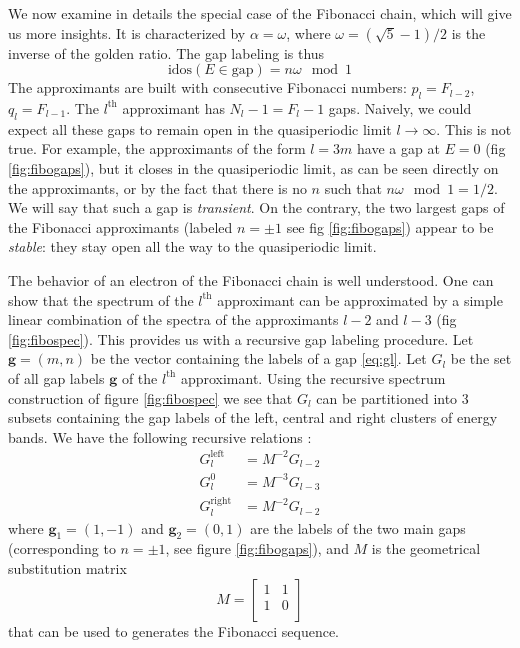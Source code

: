 \documentclass[a4paper]{jpconf}
\newcommand{\gv}{\ensuremath{\mathbf{g}}}
\newcommand{\sub}{\ensuremath{M}}
\newcommand{\id}{\ensuremath{\text{idos}}}
\begin{document}
We now examine in details the special case of the Fibonacci chain, which will give us more insights.
It is characterized by $\alpha = \omega$, where $\omega = (\sqrt{5}-1)/2$ is the inverse of the golden ratio.
The gap labeling is thus
\begin{equation}
	\label{eq:fibogaps}
	\id(E \in \text{gap}) = n \omega \mod 1
\end{equation}
The approximants are built with consecutive Fibonacci numbers: $p_l = F_{l-2}$, $q_l = F_{l-1}$.
The $l^\text{th}$ approximant has $N_l-1 = F_l -1$ gaps.
Naively, we could expect all these gaps to remain open in the quasiperiodic limit $l \to \infty$.
This is not true. 
For example, the approximants of the form $l = 3m$ have a gap at $E=0$ (fig \eqref{fig:fibogaps}), but it closes in the quasiperiodic limit, as can be seen directly on the approximants, or by the fact that there is no $n$ such that $n \omega \mod 1 = 1/2$.
We will say that such a gap is \emph{transient}.
On the contrary, the two largest gaps of the Fibonacci approximants (labeled $n = \pm 1$ see fig \eqref{fig:fibogaps}) appear to be \emph{stable}: they stay open all the way to the quasiperiodic limit.

The behavior of an electron of the Fibonacci chain is well understood. 
One can show \cite{Niu90, Piechon95} that the spectrum of the $l^\text{th}$ approximant can be approximated by a simple linear combination of the spectra of the approximants $l-2$ and $l-3$ (fig \eqref{fig:fibospec}).
This provides us with a recursive gap labeling procedure. 
Let $\gv = (m, n)$ be the vector containing the labels of a gap \eqref{eq:gl}.
Let $G_l$ be the set of all gap labels $\gv$ of the $l^\text{th}$ approximant.
Using the recursive spectrum construction of figure \eqref{fig:fibospec} we see that $G_l$ can be partitioned into 3 subsets containing the gap labels of the left, central and right clusters of energy bands.
We have the following recursive relations \cite{fiboperturbMace}:
\begin{align}
	G_{l}^{\text{left}} &= \sub^{-2} G_{l-2} \\
	G_{l}^0 &= \sub^{-3} G_{l-3} \\
	G_{l}^\text{right} &= \sub^{-2} G_{l-2}
\end{align}
where $\gv_1 = (1, -1)$ and $\gv_2 = (0, 1)$ are the labels of the two main gaps (corresponding to $n = \pm 1$, see figure \eqref{fig:fibogaps}),
and $\sub$ is the geometrical substitution matrix
\begin{equation}
	\sub = 
	\begin{bmatrix}
		1 & 1\\
		1 & 0\\
	\end{bmatrix}
\end{equation}
that can be used to generates the Fibonacci sequence.
\end{document}
